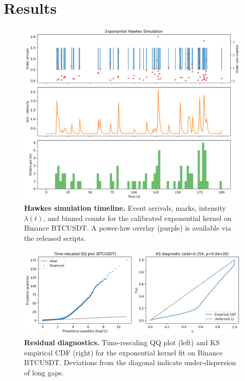 \documentclass[11pt]{article}
\newcommand{\1}{\mathbbm{1}}
\begin{document}
\section{Results}\label{sec:results}
\begin{figure}[H]
  \centering
  \includegraphics[width=0.9\linewidth]{../images/timeline_exponential.png}
  \caption{\textbf{Hawkes simulation timeline.} Event arrivals, marks, intensity $\lambda(t)$, and binned counts for the calibrated exponential kernel on Binance BTCUSDT. A power-law overlay (purple) is available via the released scripts.}
  \label{fig:timeline}
\end{figure}

\begin{figure}[H]
  \centering
  \includegraphics[width=0.9\linewidth]{../images/qq_ks_btcusdt.png}
  \caption{\textbf{Residual diagnostics.} Time-rescaling QQ plot (left) and KS empirical CDF (right) for the exponential kernel fit on Binance BTCUSDT. Deviations from the diagonal indicate under-dispersion of long gaps.}
  \label{fig:qqks}
\end{figure}
\end{document}
